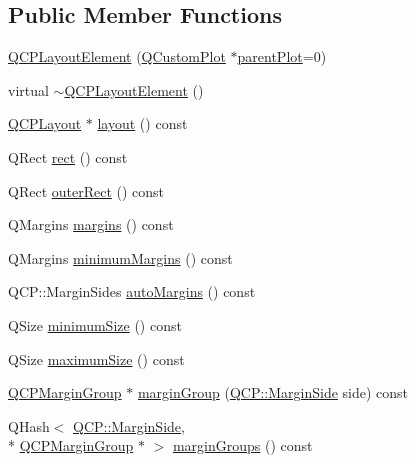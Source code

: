 \subsection*{Public Member Functions}
\begin{DoxyCompactItemize}
\item 
\hyperlink{class_q_c_p_layout_element_a8947f0ada17e672aaba3d424cbbb67e3}{Q\-C\-P\-Layout\-Element} (\hyperlink{class_q_custom_plot}{Q\-Custom\-Plot} $\ast$\hyperlink{class_q_c_p_layerable_ab7e0e94461566093d36ffc0f5312b109}{parent\-Plot}=0)
\item 
virtual \hyperlink{class_q_c_p_layout_element_a0dc52343920011b3e72d61fc94ed3400}{$\sim$\-Q\-C\-P\-Layout\-Element} ()
\item 
\hyperlink{class_q_c_p_layout}{Q\-C\-P\-Layout} $\ast$ \hyperlink{class_q_c_p_layout_element_a6235f5384db871fc6e3387a1bc558b0d}{layout} () const 
\item 
Q\-Rect \hyperlink{class_q_c_p_layout_element_affdfea003469aac3d0fac5f4e06171bc}{rect} () const 
\item 
Q\-Rect \hyperlink{class_q_c_p_layout_element_a60bbddee2d1230c2414bd776f44d17b8}{outer\-Rect} () const 
\item 
Q\-Margins \hyperlink{class_q_c_p_layout_element_a85ff977dfcced84eef32d9f819ec9543}{margins} () const 
\item 
Q\-Margins \hyperlink{class_q_c_p_layout_element_a60ec7f377c26726174d536bffb632002}{minimum\-Margins} () const 
\item 
Q\-C\-P\-::\-Margin\-Sides \hyperlink{class_q_c_p_layout_element_a2f499b1179b3126e22d0d7508124ccb3}{auto\-Margins} () const 
\item 
Q\-Size \hyperlink{class_q_c_p_layout_element_ae71f9230171d2d898e21dc461fc3df03}{minimum\-Size} () const 
\item 
Q\-Size \hyperlink{class_q_c_p_layout_element_a1fc85c79e15c2ab8051eccd455fccc4a}{maximum\-Size} () const 
\item 
\hyperlink{class_q_c_p_margin_group}{Q\-C\-P\-Margin\-Group} $\ast$ \hyperlink{class_q_c_p_layout_element_a22cb1bb62c452fd802e43ca2524660db}{margin\-Group} (\hyperlink{namespace_q_c_p_a7e487e3e2ccb62ab7771065bab7cae54}{Q\-C\-P\-::\-Margin\-Side} side) const 
\item 
Q\-Hash$<$ \hyperlink{namespace_q_c_p_a7e487e3e2ccb62ab7771065bab7cae54}{Q\-C\-P\-::\-Margin\-Side}, \\*
\hyperlink{class_q_c_p_margin_group}{Q\-C\-P\-Margin\-Group} $\ast$ $>$ \hyperlink{class_q_c_p_layout_element_ac43921c997570389c14a1671bc3ea499}{margin\-Groups} () const 

\end{DoxyCompactItemize}
